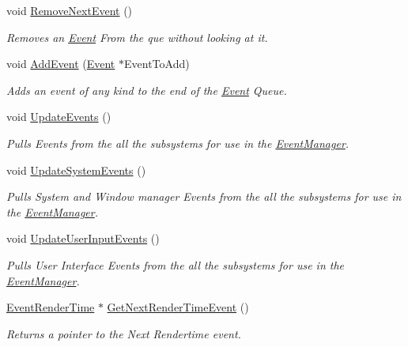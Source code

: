 \begin{DoxyCompactItemize}
void \hyperlink{classphys_1_1EventManager_a2389a44d199f121e1fea741f83248513}{RemoveNextEvent} ()
\begin{DoxyCompactList}\small\item\em Removes an \hyperlink{classphys_1_1Event}{Event} From the que without looking at it. \item\end{DoxyCompactList}\item 
void \hyperlink{classphys_1_1EventManager_a563f30ac5390d398c99cf7dbfb722000}{AddEvent} (\hyperlink{classphys_1_1Event}{Event} $\ast$EventToAdd)
\begin{DoxyCompactList}\small\item\em Adds an event of any kind to the end of the \hyperlink{classphys_1_1Event}{Event} Queue. \item\end{DoxyCompactList}\item 
void \hyperlink{classphys_1_1EventManager_a63cf23dc9fe0ced3e2c60ca61c97b166}{UpdateEvents} ()
\begin{DoxyCompactList}\small\item\em Pulls Events from the all the subsystems for use in the \hyperlink{classphys_1_1EventManager}{EventManager}. \item\end{DoxyCompactList}\item 
void \hyperlink{classphys_1_1EventManager_a0cf574c55def063d66d7db46a4d3e8a5}{UpdateSystemEvents} ()
\begin{DoxyCompactList}\small\item\em Pulls System and Window manager Events from the all the subsystems for use in the \hyperlink{classphys_1_1EventManager}{EventManager}. \item\end{DoxyCompactList}\item 
void \hyperlink{classphys_1_1EventManager_a01a5a131ac26679eee5dcf5dd514045c}{UpdateUserInputEvents} ()
\begin{DoxyCompactList}\small\item\em Pulls User Interface Events from the all the subsystems for use in the \hyperlink{classphys_1_1EventManager}{EventManager}. \item\end{DoxyCompactList}\item 
\hyperlink{classphys_1_1EventRenderTime}{EventRenderTime} $\ast$ \hyperlink{classphys_1_1EventManager_ae8730b039a280449af052d75f2e60b06}{GetNextRenderTimeEvent} ()
\begin{DoxyCompactList}\small\item\em Returns a pointer to the Next Rendertime event. \item\end{DoxyCompactList}\item 

\end{DoxyCompactItemize}
